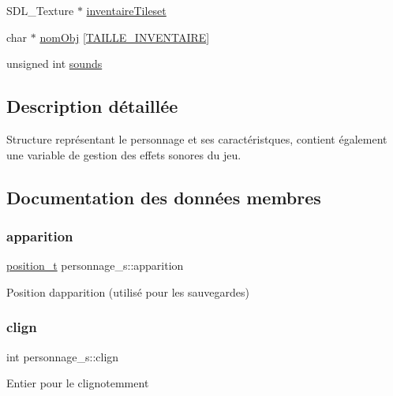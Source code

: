 \begin{DoxyCompactItemize}
\item 
S\+D\+L\+\_\+\+Texture $\ast$ \hyperlink{structpersonnage__s_a1fa7220d864d9cacc6a8ce191f9bcf29}{inventaire\+Tileset}
\item 
char $\ast$ \hyperlink{structpersonnage__s_a6fc3c82b6c4f407289aa55155876c867}{nom\+Obj} \mbox{[}\hyperlink{structs_8h_a5fdcc1659ee790f8bdd196e7745ab403}{T\+A\+I\+L\+L\+E\+\_\+\+I\+N\+V\+E\+N\+T\+A\+I\+RE}\mbox{]}
\item 
unsigned int \hyperlink{structpersonnage__s_ae3e2c166abcaaadff66047abb2594e05}{sounds}
\end{DoxyCompactItemize}


\subsection{Description détaillée}
Structure représentant le personnage et ses caractéristques, contient également une variable de gestion des effets sonores du jeu. 

\subsection{Documentation des données membres}
\mbox{\label{structpersonnage__s_a60ba887e657e6cdbdde28b63ade38709}} 
\subsubsection{\texorpdfstring{apparition}{apparition}}
{\footnotesize\ttfamily \hyperlink{structposition__s}{position\+\_\+t} personnage\+\_\+s\+::apparition}

Position d\textquotesingle{}apparition (utilisé pour les sauvegardes) \mbox{\label{structpersonnage__s_a219acff65d3b506a69408ca316efeeec}} 
\subsubsection{\texorpdfstring{clign}{clign}}
{\footnotesize\ttfamily int personnage\+\_\+s\+::clign}

Entier pour le clignotemment \mbox{\label{structpersonnage__s_a09fb83af37953227050f9ced0410f032}} 
